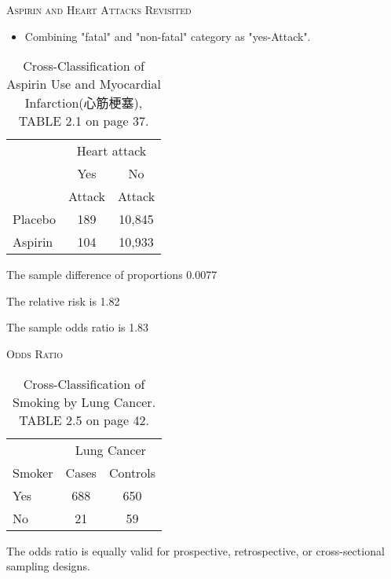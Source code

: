 \documentclass[dvipdfmx, serif,handout]{beamer}
\begin{document}
\begin{frame}{\textsc{Aspirin and Heart Attacks Revisited}}

\begin{itemize}
\item Combining "fatal" and "non-fatal" category as "yes-Attack".
\end{itemize}
{\scriptsize
\begin{table}
\renewcommand{\arraystretch}{1.0}
\begin{tabular}{lcc} \\ \hline
& \multicolumn{2}{c}{Heart attack} \\ \cline{2-3}
& Yes & No \\
& Attack & Attack \\ \hline
Placebo & 189  & 10,845 \\
Aspirin & 104  &10,933 \\ \hline
\end{tabular}
\caption{\scriptsize Cross-Classification of Aspirin Use and Myocardial Infarction(心筋梗塞), TABLE 2.1 on page 37.}
\end{table}
}

\bi
\item The sample difference of proportions 0.0077
\item The relative risk is 1.82
\item The sample odds ratio is 1.83
\ei

\end{frame}
\begin{frame}{\textsc{Odds Ratio}}

{\scriptsize
\begin{table}
\renewcommand{\arraystretch}{1.0}
\begin{tabular}{lcc} \\ \hline
 & \multicolumn{2}{c}{Lung Cancer} \\ \cline{2-3}
Smoker & Cases & Controls \\ \hline
Yes & 688 & 650 \\
No & 21 & 59 \\ \hline
\end{tabular}
\caption{\scriptsize Cross-Classification of Smoking by Lung Cancer. TABLE 2.5 on page 42.}
\end{table}
}

\bi
\item The odds ratio is equally valid for prospective, retrospective, or cross-sectional sampling designs.
\ei

\end{frame}
\end{document}
